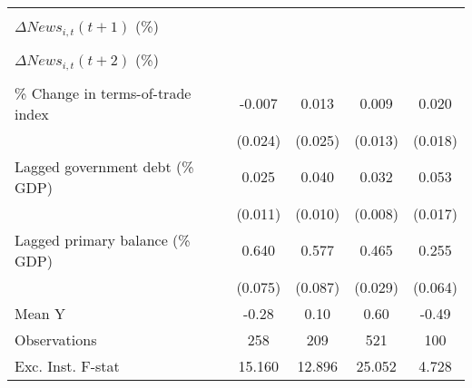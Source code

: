 {\begin{tabular}{l*{4}{c}}
                    &                     &                     &                     &                     \\
\addlinespace
$ \Delta News_{i,t}(t+1)$ (\%)&                     &                     &                     &                     \\
                    &                     &                     &                     &                     \\
\addlinespace
$ \Delta News_{i,t}(t+2)$ (\%)&                     &                     &                     &                     \\
                    &                     &                     &                     &                     \\
\addlinespace
\% Change in terms-of-trade index&      -0.007         &       0.013         &       0.009         &       0.020         \\
                    &     (0.024)         &     (0.025)         &     (0.013)         &     (0.018)         \\
\addlinespace
Lagged government debt (\% GDP)&       0.025\sym{**} &       0.040\sym{***}&       0.032\sym{***}&       0.053\sym{***}\\
                    &     (0.011)         &     (0.010)         &     (0.008)         &     (0.017)         \\
\addlinespace
Lagged primary balance (\% GDP)&       0.640\sym{***}&       0.577\sym{***}&       0.465\sym{***}&       0.255\sym{***}\\
                    &     (0.075)         &     (0.087)         &     (0.029)         &     (0.064)         \\
\midrule
Mean Y              &       -0.28         &        0.10         &        0.60         &       -0.49         \\
Observations        &         258         &         209         &         521         &         100         \\
Exc. Inst. F-stat   &      15.160         &      12.896         &      25.052         &       4.728         \\
\bottomrule
\end{tabular}
}

